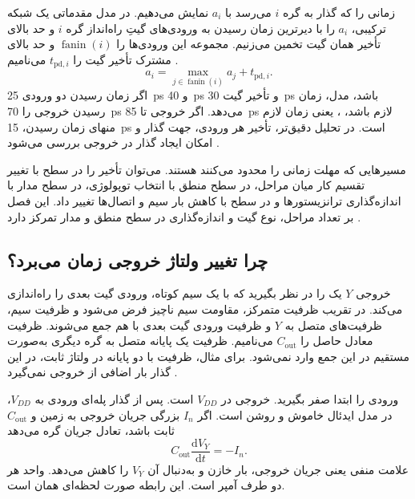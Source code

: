 زمانی را که گذار به گره \(i\) می‌رسد با \(a_i\) نمایش می‌دهیم.
در مدل مقدماتی یک شبکه ترکیبی، \(a_i\) را با دیرترین زمان رسیدن
به ورودی‌های گیتِ راه‌انداز گره \(i\) و حد بالای تأخیر همان گیت
تخمین می‌زنیم. مجموعه این ورودی‌ها را \(\operatorname{fanin}(i)\)
و حد بالای مشترک تأخیر گیت را \(t_{\mathrm{pd},i}\) می‌نامیم
\cite[رابطه ، صفحه ۱۴۲]{weste}.
\begin{equation}
  a_i=\max_{j\in\operatorname{fanin}(i)} a_j+t_{\mathrm{pd},i}.
  \label{eq:delay-arrival}
\end{equation}
اگر زمان رسیدن دو ورودی \qty{25}{\pico\second} و
\qty{40}{\pico\second} و تأخیر گیت \qty{30}{\pico\second} باشد،
مدل، زمان رسیدن خروجی را \qty{70}{\pico\second} می‌دهد. اگر
خروجی تا \qty{85}{\pico\second} لازم باشد، ، یعنی
زمان لازم منهای زمان رسیدن، \qty{15}{\pico\second} است. در تحلیل
دقیق‌تر، تأخیر هر ورودی، جهت گذار و امکان ایجاد گذار در خروجی
بررسی می‌شود \cite[بخش ، صفحه ۱۴۲]{weste}.

مسیرهایی که مهلت زمانی را محدود می‌کنند  هستند.
می‌توان تأخیر را در سطح  با تغییر تقسیم کار میان
مراحل، در سطح منطق با انتخاب توپولوژی، در سطح مدار با اندازه‌گذاری
ترانزیستورها و در سطح  با کاهش بار سیم و اتصال‌ها تغییر داد.
این فصل بر تعداد مراحل، نوع گیت و اندازه‌گذاری در سطح منطق و مدار
تمرکز دارد \cite[بخش ، صفحات ۱۴۲ و ۱۴۳]{weste}.

\subsection{چرا تغییر ولتاژ خروجی زمان می‌برد؟}
\label{sec:delay-inverter-transient}

خروجی \(Y\) یک  را در نظر بگیرید که با یک سیم کوتاه،
ورودی گیت بعدی را راه‌اندازی می‌کند. در تقریب ظرفیت متمرکز، مقاومت
سیم ناچیز فرض می‌شود و ظرفیت سیم، ظرفیت‌های  متصل به
\(Y\) و ظرفیت ورودی گیت بعدی با هم جمع می‌شوند. ظرفیت معادل حاصل را
\(C_{\mathrm{out}}\) می‌نامیم. ظرفیت یک پایانه متصل به گره دیگری
به‌صورت مستقیم در این جمع وارد نمی‌شود. برای مثال، ظرفیت
 با دو پایانه در ولتاژ ثابت، در این گذار بار
اضافی از خروجی نمی‌گیرد \cite[بخش  و شکل
، صفحات ۱۴۳ و ۱۴۴]{weste}.

ورودی را ابتدا صفر بگیرید. خروجی در \(V_{DD}\) است. پس از گذار
پله‌ای ورودی به \(V_{DD}\)، در مدل ایدئال  خاموش و
 روشن است. اگر \(I_n\) بزرگی جریان خروجی به زمین و
\(C_{\mathrm{out}}\) ثابت باشد، تعادل جریان گره می‌دهد
\begin{equation}
  C_{\mathrm{out}}\frac{\mathrm{d}V_Y}{\mathrm{d}t}=-I_n.
  \label{eq:delay-step-kcl}
\end{equation}
علامت منفی یعنی جریان خروجی، بار خازن و به‌دنبال آن \(V_Y\) را کاهش
می‌دهد. واحد هر دو طرف آمپر است. این رابطه صورت لحظه‌ای همان
 است.

